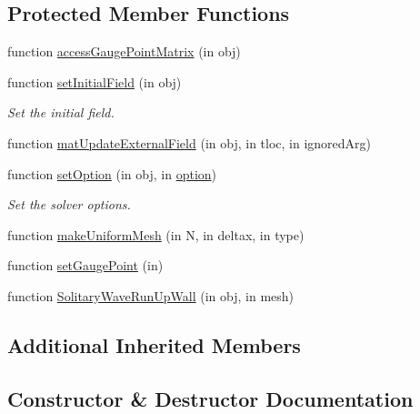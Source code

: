 \subsection*{Protected Member Functions}
\begin{DoxyCompactItemize}
\item 
function \hyperlink{class_solitary_wave_test_a738d22f96e7a9a2ad359b49aa5fa4bac}{access\+Gauge\+Point\+Matrix} (in obj)
\item 
function \hyperlink{class_solitary_wave_test_a58da226e25b0e5759cbb7bd2c2f4e530}{set\+Initial\+Field} (in obj)
\begin{DoxyCompactList}\small\item\em Set the initial field. \end{DoxyCompactList}\item 
function \hyperlink{class_solitary_wave_test_a553572b683e5f7e27efcb6262661323b}{mat\+Update\+External\+Field} (in obj, in tloc, in ignored\+Arg)
\item 
function \hyperlink{class_solitary_wave_test_a575f550c46b49fac5ef74e87f05bc806}{set\+Option} (in obj, in \hyperlink{class_ndg_phys_af91f4c54b93504e76b38a5693774dff1}{option})
\begin{DoxyCompactList}\small\item\em Set the solver options. \end{DoxyCompactList}\item 
function \hyperlink{class_solitary_wave_test_ab979913e90f94297b97bdc4874b86272}{make\+Uniform\+Mesh} (in N, in deltax, in type)
\item 
function \hyperlink{class_solitary_wave_test_a047e64b1a7920652289d870aa97a50ad}{set\+Gauge\+Point} (in)
\item 
function \hyperlink{class_solitary_wave_test_aaa5dc4949712fb91e94881bd4d387a73}{Solitary\+Wave\+Run\+Up\+Wall} (in obj, in mesh)
\end{DoxyCompactItemize}
\subsection*{Additional Inherited Members}


\subsection{Constructor \& Destructor Documentation}
\mbox{\label{class_solitary_wave_test_a1a3a89e557bf2c2e5cd8e13d15c3f836}} 

